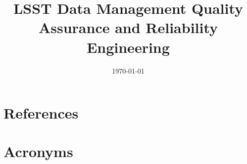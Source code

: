 \documentclass[modern]{aastex62}
\begin{document}

\date{\today}
\title{LSST Data Management Quality Assurance and Reliability Engineering}









\appendix

\section{References} \label{sec:bib}



\section{Acronyms} \label{sec:acronyms}

\end{document}
